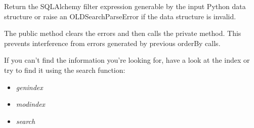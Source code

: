 \documentclass[letterpaper,10pt,english]{sphinxmanual}
\begin{document}
\begin{fulllineitems}
\begin{fulllineitems}
\label{api:onlinelinguisticdatabase.lib.SQLAQueryBuilder.SQLAQueryBuilder.getSQLAFilter}
Return the SQLAlchemy filter expression generable by the input Python
data structure or raise an OLDSearchParseError if the data structure is
invalid.

\end{fulllineitems}


\begin{fulllineitems}
\label{api:onlinelinguisticdatabase.lib.SQLAQueryBuilder.SQLAQueryBuilder.getSQLAOrderBy}
The public method clears the errors and then calls the private method.
This prevents interference from errors generated by previous orderBy calls.

\end{fulllineitems}


\end{fulllineitems}


If you can't find the information you're looking for, have a look at the index
or try to find it using the search function:
\begin{itemize}
\item {} 
\emph{genindex}

\item {} 
\emph{modindex}

\item {} 
\emph{search}

\end{itemize}

\begin{thebibliography}{Kopka.2004}
\end{thebibliography}
\end{document}
